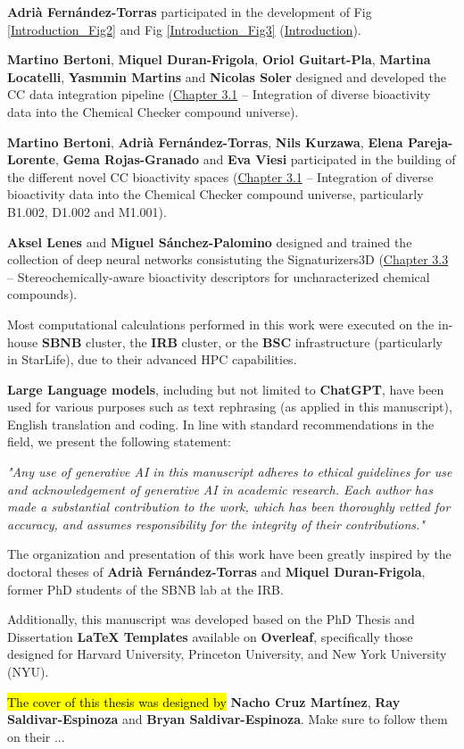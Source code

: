 

\textbf{Adrià Fernández-Torras} participated in the development of Fig \ref{Introduction_Fig2} and Fig \ref{Introduction_Fig3} (\hyperref[introduction]{Introduction}).

\textbf{Martino Bertoni}, \textbf{Miquel Duran-Frigola}, \textbf{Oriol Guitart-Pla}, \textbf{Martina Locatelli}, \textbf{Yasmmin Martins} and \textbf{Nicolas Soler} designed and developed the CC data integration pipeline (\hyperref[Chapter_3.1]{Chapter 3.1} -- Integration of diverse bioactivity data into the Chemical Checker compound universe).

\textbf{Martino Bertoni}, \textbf{Adrià Fernández-Torras}, \textbf{Nils Kurzawa}, \textbf{Elena Pareja-Lorente}, \textbf{Gema Rojas-Granado} and \textbf{Eva Viesi} participated in the building of the different novel CC bioactivity spaces (\hyperref[Chapter_3.1]{Chapter 3.1} -- Integration of diverse bioactivity data into the Chemical Checker compound universe, particularly B1.002, D1.002 and M1.001).

\textbf{Aksel Lenes} and \textbf{Miguel Sánchez-Palomino} designed and trained the collection of deep neural networks consistuting the Signaturizers3D (\hyperref[Chapter_3.3]{Chapter 3.3} -- Stereochemically-aware bioactivity descriptors for uncharacterized chemical compounds).

Most computational calculations performed in this work were executed on the in-house \textbf{SBNB} cluster, the \textbf{IRB} cluster, or the \textbf{BSC} infrastructure (particularly in StarLife), due to their advanced HPC capabilities.

\textbf{Large Language models}, including but not limited to \textbf{ChatGPT}, have been used for various purposes such as text rephrasing (as applied in this manuscript), English translation and coding. In line with standard recommendations in the field\cite{porsdam_mann_guidelines_2024}, we present the following statement:

\textit{"Any use of generative AI in this manuscript adheres to ethical guidelines for use and acknowledgement of generative AI in academic research. Each author has made a substantial contribution to the work, which has been thoroughly vetted for accuracy, and assumes responsibility for the integrity of their contributions."}

The organization and presentation of this work have been greatly inspired by the doctoral theses of \textbf{Adrià Fernández-Torras} and \textbf{Miquel Duran-Frigola}, former PhD students of the SBNB lab at the IRB. 

Additionally, this manuscript was developed based on the PhD Thesis and Dissertation \textbf{LaTeX Templates} available on \textbf{Overleaf}, specifically those designed for Harvard University, Princeton University, and New York University (NYU).

\hl{The cover of this thesis was designed by} \textbf{Nacho Cruz Martínez}, \textbf{Ray Saldivar-Espinoza} and \textbf{Bryan Saldivar-Espinoza}. Make sure to follow them on their ...